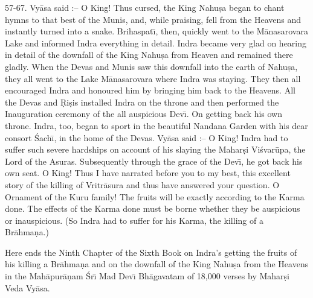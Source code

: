 57-67. Vy\=asa said :-- O King! Thus cursed, the King Nahu\d{s}a began to chant hymns to that best of the Munis, and, while praising, fell from the Heavens and instantly turned into a snake. Brihaspat\={\i}, then, quickly went to the M\=anasarovara Lake and informed Indra everything in detail. Indra became very glad on hearing in detail of the downfall of the King Nahu\d{s}a from Heaven and remained there gladly. When the Devas and Munis saw this downfall into the earth of Nahu\d{s}a, they all went to the Lake M\=anasarovara where Indra was staying. They then all encouraged Indra and honoured him by bringing him back to the Heavens. All the Devas and \d{R}i\d{s}is installed Indra on the throne and then performed the Inauguration ceremony of the all auspicious Dev\={\i}. On getting back his own throne. Indra, too, began to sport in the beautiful Nandana Garden with his dear consort \'Sach\={\i}, in the home of the Devas. Vy\=asa said :-- O King! Indra had to suffer such severe hardships on account of his slaying the Mahar\d{s}i Vi\'svar\=upa, the Lord of the Asuras. Subsequently through the grace of the Dev\={\i}, he got back his own seat. O King! Thus I have narrated before you to my best, this excellent story of the killing of Vritr\=asura and thus have answered your question. O Ornament of the Kuru family! The fruits will be exactly according to the Karma done. The effects of the Karma done must be borne whether they be auspicious or inauspicious. (So Indra had to suffer for his Karma, the killing of a Br\=ahma\d{n}a.)

Here ends the Ninth Chapter of the Sixth Book on Indra's getting the fruits of his killing a Br\=ahma\d{n}a and on the downfall of the King Nahu\d{s}a from the Heavens in the Mah\=apur\=a\d{n}am \'Sr\={\i} Mad Dev\={\i} Bh\=agavatam of 18,000 verses by Mahar\d{s}i Veda Vy\=asa.



